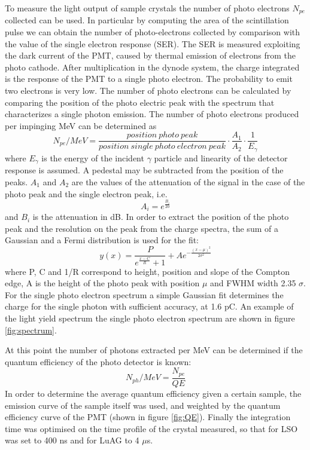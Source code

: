 To measure the light output of sample crystals the number of photo electrons $N_{pe}$ collected can be used.
In particular by computing the area of the scintillation pulse we can obtain the number of photo-electrons collected by comparison with the value of the single electron response (SER).
The SER is measured exploiting the dark current of the PMT, caused by thermal emission of electrons from the photo cathode.
After multiplication in the dynode system, the charge integrated is the response of the PMT to a single photo electron.
The probability to emit two electrons is very low.
The number of photo electrons can be calculated by comparing the position of the photo electric peak with the spectrum that characterizes a single photon emission. The number of photo electrons produced per impinging MeV can be determined as
\begin{equation}
N_{pe}/MeV=\frac{position\ photo\ peak}{position\ single\ photo\ electron\ peak} \cdot \frac{A_{1}}{A_{2}} \cdot \frac{1}{E_{\gamma}}
\end{equation}
where $E_{\gamma}$ is the energy of the incident $\gamma$ particle and linearity of the detector response is assumed. A pedestal may be subtracted from the position of the peaks. $A_{1}$ and $A_{2}$ are the values of the attenuation of the signal in the case of the photo peak and the single electron peak, i.e.
\begin{equation}
A_{i}=e^{\frac{B_{i}}{20}}
\end{equation}
and $B_{i}$ is the attenuation in dB.
In order to extract the position of the photo peak and the resolution on the peak  from the charge spectra, the sum of a Gaussian and a Fermi distribution is used for the fit:
\begin{equation}
y(x)=\frac{P}{e^{\frac{x-C}{R}}+1}+Ae^{-\frac{(x-\mu)^{2}}{2\sigma ^{2}}}
\end{equation}
where P, C and 1/R correspond to height, position and slope of the Compton edge, A is the height of the photo peak with position $\mu$ and FWHM width 2.35 $\sigma$.
For the single photo electron spectrum a simple Gaussian fit determines the charge for the single photon with sufficient accuracy, at 1.6 pC.
An example of the light yield spectrum the single photo electron spectrum are shown in figure \ref{fig:spectrum}.

At this point the number of photons extracted per MeV can be determined if the quantum efficiency of the photo detector is known:
\begin{equation}
N_{ph}/MeV=\frac{N_{pe}}{QE}
\end{equation}
In order to determine the average quantum efficiency given a certain sample, the emission curve of the sample itself was used, and weighted by the quantum efficiency curve of the PMT (shown in figure \ref{fig:QE}).
Finally the integration time was optimised on the time profile of the crystal measured, so that for LSO was set to 400 ns and for LuAG to 4 $\mu$s.

